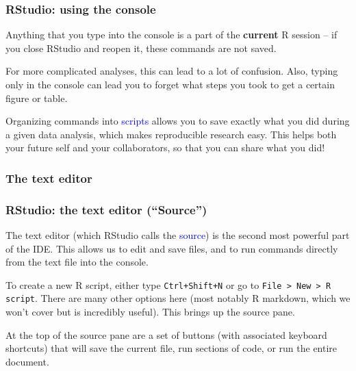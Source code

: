\documentclass[11pt,dvipsnames]{beamer}
\newcommand{\myframe}[1]{\begin{frame} \frametitle{#1}}
\begin{document}
\begin{frame}
\frametitle{RStudio: using the console}
Anything that you type into the console is a part of the \textbf{current} R session -- if you close RStudio and reopen it, these commands are not saved. \pause

For more complicated analyses, this can lead to a lot of confusion. Also, typing only in the console can lead you to forget what steps you took to get a certain figure or table. \pause

Organizing commands into \textcolor{blue}{scripts} allows you to save exactly what you did during a given data analysis, which makes reproducible research easy. This helps both your future self and your collaborators, so that you can share what you did!
\end{frame}

\subsubsection{The text editor}
\myframe{RStudio: the text editor (``Source'')}
The text editor (which RStudio calls the \textcolor{blue}{source}) is the second most powerful part of the IDE. This allows us to edit and save files, and to run commands directly from the text file into the console. \pause

To create a new R script, either type \texttt{Ctrl+Shift+N} or go to \texttt{File > New > R script}. There are many other options here (most notably R markdown, which we won't cover but is incredibly useful). This brings up the source pane. \pause

At the top of the source pane are a set of buttons (with associated keyboard shortcuts) that will save the current file, run sections of code, or run the entire document. 
\end{frame}
\end{document}
